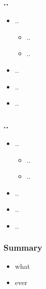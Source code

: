 \documentclass[pdftex]{beamer}
\newcommand{\conclusions}{%
\begin{frame}
  \frametitle{Summary}
  \begin{itemize}
  \item what
  \item ever
  \end{itemize}
\end{frame}}
\begin{document}
\begin{frame}
  \frametitle{..}
  \begin{itemize}
  \item ..
    \begin{itemize}
    \item ..
    \item ..
    \end{itemize}
  \item ..
  \item ..
  \item ..
  \end{itemize}
\end{frame}

\begin{frame}
  \frametitle{..}
  \begin{itemize}
  \item ..
    \begin{itemize}
    \item ..
    \item ..
    \end{itemize}
  \item ..
  \item ..
  \item ..
  \end{itemize}
\end{frame}

\conclusions
\end{document}
